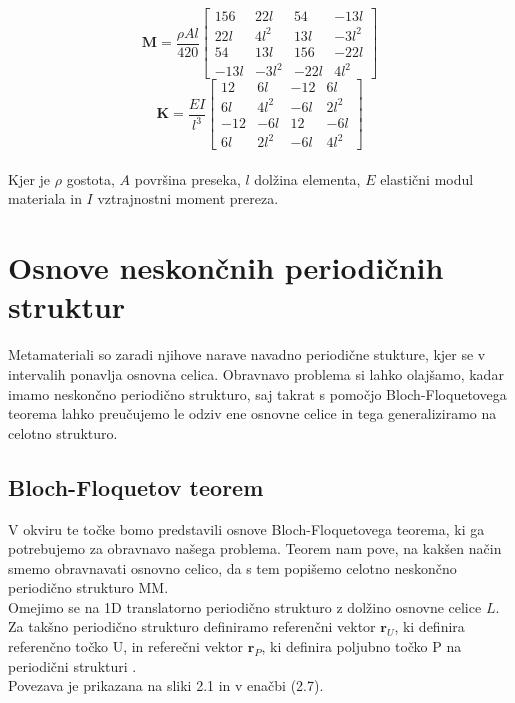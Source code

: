 \documentclass[12pt]{report}
\begin{document}
\begin{equation}
  \mathbf{M} = \frac{\rho A l}{420} 
  \begin{bmatrix}
    156 & 22l & 54 & -13l \\
    22l & 4l^2 & 13l & -3l^2 \\
    54 & 13l & 156 & -22l \\
    -13l & -3l^2 & -22l & 4l^2
  \end{bmatrix}
\end{equation}
\begin{equation}
  \mathbf{K} = \frac{EI}{l^3} 
  \begin{bmatrix}
    12 & 6l & -12 & 6l \\
    6l & 4l^2 & -6l & 2l^2 \\
    -12 & -6l & 12 & -6l \\
    6l & 2l^2 & -6l & 4l^2
  \end{bmatrix}
\end{equation}
\\
Kjer je $\rho$ gostota, $A$ površina preseka, $l$ dolžina elementa, $E$ elastični modul materiala in $I$ vztrajnostni moment prereza.

\section{Osnove neskončnih periodičnih struktur}
Metamateriali so zaradi njihove narave navadno periodične stukture, kjer se v intervalih ponavlja osnovna celica.
Obravnavo problema si lahko olajšamo, kadar imamo neskončno periodično strukturo, saj takrat s pomočjo Bloch-Floquetovega teorema lahko 
preučujemo le odziv ene osnovne celice in tega generaliziramo na celotno strukturo.

\subsection{Bloch-Floquetov teorem}
V okviru te točke bomo predstavili osnove Bloch-Floquetovega teorema, ki ga potrebujemo za obravnavo našega problema.
Teorem nam pove, na kakšen način smemo obravnavati osnovno celico, da s tem popišemo celotno neskončno periodično strukturo \ac{MM}. \\
Omejimo se na 1D translatorno periodično strukturo z dolžino osnovne celice $L$. Za takšno periodično strukturo definiramo referenčni vektor $\mathbf{r}_U$, 
ki definira referenčno točko U, in referečni vektor $\mathbf{r}_P$, ki definira poljubno točko P na periodični strukturi \cite{vanbelle, kosir}.
\\Povezava je prikazana na sliki 2.1 in v enačbi (2.7).
\end{document}
